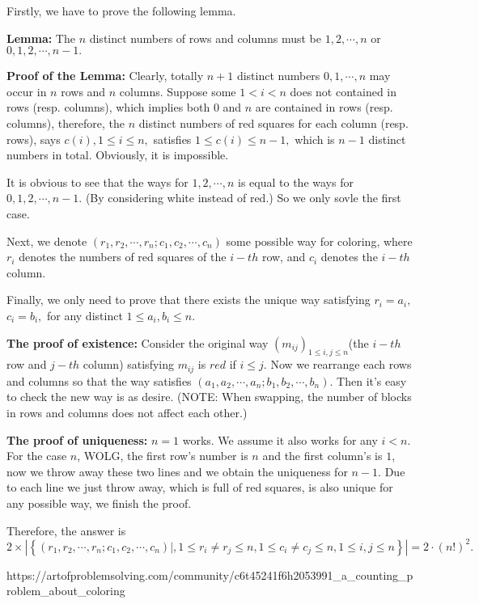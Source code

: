 \begin{shortque*}{}
{        Firstly, we have to prove the following lemma.

        \textbf{Lemma:} The $n$ distinct numbers of rows and columns must be ${1,2,\cdots,n}$ or ${0,1,2,\cdots,n-1}.$

        \textbf{Proof of the Lemma:} Clearly, totally $n+1$ distinct numbers ${0,1,\cdots,n}$ may occur in $n$ rows and $n$ columns. Suppose some $1<i<n$ does not contained in rows (resp. columns), which implies both $0$ and $n$ are contained in rows (resp. columns), therefore, the $n$ distinct numbers of red squares for each column (resp. rows), says $c(i), 1\leq i\leq n,$ satisfies $1\leq c(i) \leq n-1,$ which is $n-1$ distinct numbers in total. Obviously, it is impossible.

        It is obvious to see that the ways for ${1,2,\cdots,n}$ is equal to the ways for ${0,1,2,\cdots,n-1}.$ (By considering white instead of red.) So we only sovle the first case.

        Next, we denote $(r_1,r_2,\cdots,r_n; c_1,c_2,\cdots,c_n)$ some possible way for coloring, where $r_i$ denotes the numbers of red squares of the $i-th$ row, and $c_i$ denotes the $i-th$ column.

        Finally, we only need to prove that there exists the unique way satisfying $r_i=a_i,$ $c_i=b_i,$ for any distinct $1\leq a_i,b_i\leq n.$

        \textbf{The proof of existence:} Consider the original way $(m_{ij})_{1\leq i,j\leq n}$(the $i-th$ row and $j-th$ column) satisfying $m_{ij}$ is $red$ if $i\leq j$. Now we rearrange each rows and columns so that the way satisfies $(a_1,a_2,\cdots,a_n; b_1,b_2,\cdots,b_n).$ Then it's easy to check the new way is as desire. (NOTE: When swapping, the number of blocks in rows and columns does not affect each other.)

        \textbf{The proof of uniqueness:} $n=1$ works. We assume it also works for any $i<n.$ For the case $n$, WOLG, the first row's number is $n$ and the first column's is $1$, now we throw away these two lines and we obtain the uniqueness for $n-1.$ Due to each line we just throw away, which is full of red squares, is also unique for any possible way, we finish the proof.

        Therefore, the answer is $$2\times\left|\left\{(r_1,r_2,\cdots,r_n; c_1,c_2,\cdots,c_n)|, 1\leq r_i\neq r_j\leq n, 1\leq c_i\neq c_j\leq n, 1\leq i,j\leq n\right\}\right|=2\cdot (n!)^2.$$
        }{%
        https://artofproblemsolving.com/community/c6t45241f6h2053991_a_counting_problem_about_coloring
    }


\end{shortque*}
